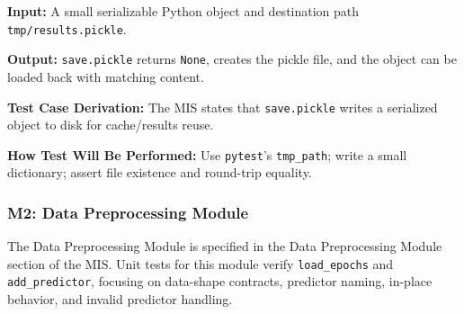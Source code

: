 \documentclass[12pt, titlepage]{article}
\begin{document}
\begin{enumerate}
\textbf{Input:} A small serializable Python object and destination path \texttt{tmp/results.pickle}.

\textbf{Output:} \texttt{save.pickle} returns \texttt{None}, creates the pickle file, and the object can be loaded back with matching content.

\textbf{Test Case Derivation:} The MIS states that \texttt{save.pickle} writes a serialized object to disk for cache/results reuse.

\textbf{How Test Will Be Performed:} Use \texttt{pytest}'s \texttt{tmp\_path}; write a small dictionary; assert file existence and round-trip equality.

\end{enumerate}

\subsubsection{M2: Data Preprocessing Module}

The Data Preprocessing Module is specified in the Data Preprocessing Module section of the MIS. Unit tests for this module verify \texttt{load\_epochs} and \texttt{add\_predictor}, focusing on data-shape contracts, predictor naming, in-place behavior, and invalid predictor handling.
\end{document}
